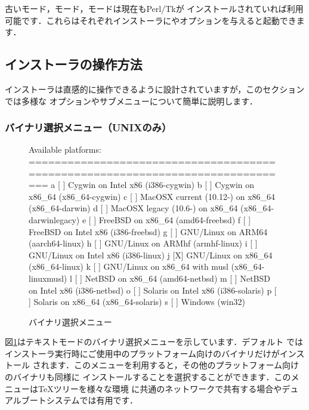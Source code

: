 \documentclass[uplatex,dvipdfmx]{jsarticle}
\begin{document}
古いモード，モード，モードは現在もPerl/Tkが
インストールされていれば利用可能です．これらはそれぞれインストーラにやオプションを与えると起動できます．

\subsection{インストーラの操作方法}
\label{sec:runinstall}

インストーラは直感的に操作できるように設計されていますが，このセクションでは多様な
オプションやサブメニューについて簡単に説明します．

\subsubsection{バイナリ選択メニュー（UNIXのみ）}
\label{sec:binary}

\begin{figure}[tb]
\begin{boxedverbatim}
Available platforms:
===============================================================================
   a [ ] Cygwin on Intel x86 (i386-cygwin)
   b [ ] Cygwin on x86_64 (x86_64-cygwin)
   c [ ] MacOSX current (10.12-) on x86_64 (x86_64-darwin)
   d [ ] MacOSX legacy (10.6-) on x86_64 (x86_64-darwinlegacy)
   e [ ] FreeBSD on x86_64 (amd64-freebsd)
   f [ ] FreeBSD on Intel x86 (i386-freebsd)
   g [ ] GNU/Linux on ARM64 (aarch64-linux)
   h [ ] GNU/Linux on ARMhf (armhf-linux)
   i [ ] GNU/Linux on Intel x86 (i386-linux)
   j [X] GNU/Linux on x86_64 (x86_64-linux)
   k [ ] GNU/Linux on x86_64 with musl (x86_64-linuxmusl)
   l [ ] NetBSD on x86_64 (amd64-netbsd)
   m [ ] NetBSD on Intel x86 (i386-netbsd)
   o [ ] Solaris on Intel x86 (i386-solaris)
   p [ ] Solaris on x86_64 (x86_64-solaris)
   s [ ] Windows (win32)
\end{boxedverbatim}
\vspace{-1zh}
\caption{バイナリ選択メニュー}\label{fig:bin-text}
\end{figure}

図\ref{fig:bin-text}はテキストモードのバイナリ選択メニューを示しています．デフォルト
ではインストーラ実行時にご使用中のプラットフォーム向けのバイナリだけがインストール
されます．このメニューを利用すると，その他のプラットフォーム向けのバイナリも同様に
インストールすることを選択することができます．このメニューは\TeX ツリーを様々な環境
に共通のネットワークで共有する場合やデュアルブートシステムでは有用です．
\end{document}

